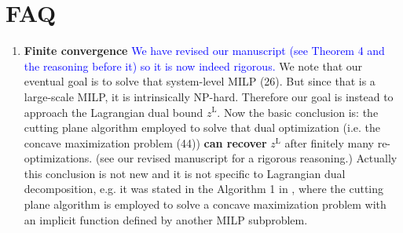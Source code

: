 \documentclass[11pt]{article}
\begin{document}
\section{FAQ} \label{faqsect}
\begin{enumerate}
    \item \textbf{Finite convergence} \label{finiteConverge}
    \textcolor{blue}{We have revised our manuscript (see Theorem 4 and the reasoning before it) so it is now indeed rigorous.} We note that our eventual goal is to solve that system-level MILP (26). But since that is a large-scale MILP, it is intrinsically NP-hard. Therefore our goal is instead to approach the Lagrangian dual bound $z^\mathrm{L}$.
    Now the basic conclusion is: the cutting plane algorithm employed to solve that dual optimization (i.e. the concave maximization problem (44)) \textbf{can recover} $z^\mathrm{L}$ after finitely many re-optimizations. (see our revised manuscript for a rigorous reasoning.)
    Actually this conclusion is not new and it is not specific to Lagrangian dual decomposition, e.g. it was stated in the Algorithm 1 in \cite{chenrui2022}, where the cutting plane algorithm is employed to solve a concave maximization problem with an implicit function defined by another MILP subproblem.


\end{enumerate}
\end{document}
